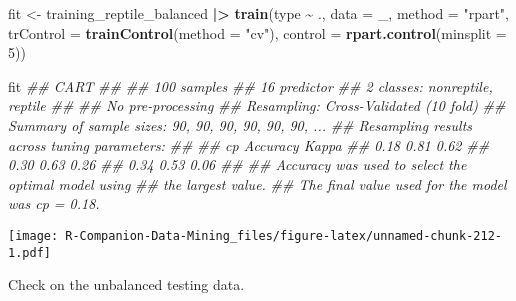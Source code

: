 \documentclass[
  notitlepage]{book}
\newenvironment{Shaded}{\begin{snugshade}}{\end{snugshade}}
\newcommand{\CommentTok}[1]{\textcolor[rgb]{0.56,0.35,0.01}{\textit{#1}}}
\newcommand{\DataTypeTok}[1]{\textcolor[rgb]{0.13,0.29,0.53}{#1}}
\newcommand{\DecValTok}[1]{\textcolor[rgb]{0.00,0.00,0.81}{#1}}
\newcommand{\ErrorTok}[1]{\textcolor[rgb]{0.64,0.00,0.00}{\textbf{#1}}}
\newcommand{\KeywordTok}[1]{\textcolor[rgb]{0.13,0.29,0.53}{\textbf{#1}}}
\newcommand{\NormalTok}[1]{#1}
\newcommand{\OperatorTok}[1]{\textcolor[rgb]{0.81,0.36,0.00}{\textbf{#1}}}
\newcommand{\StringTok}[1]{\textcolor[rgb]{0.31,0.60,0.02}{#1}}
\begin{document}
\begin{Shaded}
\begin{Highlighting}[]
\NormalTok{fit \textless{}{-}}\StringTok{ }\NormalTok{training\_reptile\_balanced }\OperatorTok{|}\ErrorTok{\textgreater{}}\StringTok{ }
\StringTok{  }\KeywordTok{train}\NormalTok{(type }\OperatorTok{\textasciitilde{}}\StringTok{ }\NormalTok{.,}
        \DataTypeTok{data =}\NormalTok{ \_,}
        \DataTypeTok{method =} \StringTok{"rpart"}\NormalTok{,}
        \DataTypeTok{trControl =} \KeywordTok{trainControl}\NormalTok{(}\DataTypeTok{method =} \StringTok{"cv"}\NormalTok{),}
        \DataTypeTok{control =} \KeywordTok{rpart.control}\NormalTok{(}\DataTypeTok{minsplit =} \DecValTok{5}\NormalTok{))}

\NormalTok{fit}
\CommentTok{\#\# CART }
\CommentTok{\#\# }
\CommentTok{\#\# 100 samples}
\CommentTok{\#\#  16 predictor}
\CommentTok{\#\#   2 classes: \textquotesingle{}nonreptile\textquotesingle{}, \textquotesingle{}reptile\textquotesingle{} }
\CommentTok{\#\# }
\CommentTok{\#\# No pre{-}processing}
\CommentTok{\#\# Resampling: Cross{-}Validated (10 fold) }
\CommentTok{\#\# Summary of sample sizes: 90, 90, 90, 90, 90, 90, ... }
\CommentTok{\#\# Resampling results across tuning parameters:}
\CommentTok{\#\# }
\CommentTok{\#\#   cp    Accuracy  Kappa}
\CommentTok{\#\#   0.18  0.81      0.62 }
\CommentTok{\#\#   0.30  0.63      0.26 }
\CommentTok{\#\#   0.34  0.53      0.06 }
\CommentTok{\#\# }
\CommentTok{\#\# Accuracy was used to select the optimal model using}
\CommentTok{\#\#  the largest value.}
\CommentTok{\#\# The final value used for the model was cp = 0.18.}
\end{Highlighting}
\end{Shaded}

\begin{Shaded}
\end{Shaded}

\texttt{[image: R-Companion-Data-Mining\_files/figure-latex/unnamed-chunk-212-1.pdf]}

Check on the unbalanced testing data.
\end{document}
